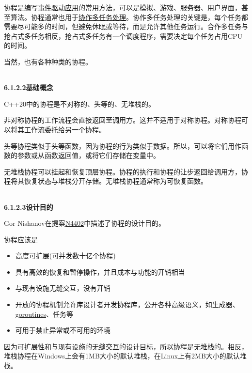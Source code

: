 协程是编写\href{https://en.wikipedia.org/wiki/Event-driven_programming}{事件驱动应用}的常用方法，可以是模拟、游戏、服务器、用户界面，甚至算法。协程通常也用于\href{https://en.wikipedia.org/wiki/Computer_multitasking}{协作多任务处理}。协作多任务处理的关键是，每个任务都需要尽可能多的时间，但避免休眠或等待，而是允许其他任务运行。合作多任务与抢占式多任务相反，抢占式多任务有一个调度程序，需要决定每个任务占用CPU的时间。

当然，也有各种种类的协程。

\hspace*{\fill} \\ %
\noindent
\textbf{6.1.2.2\hspace{0.2cm}基础概念}

C++20中的协程是不对称的、头等的、无堆栈的。

非对称协程的工作流程会直接返回至调用方。这并不适用于对称协程。对称协程可以将其工作流委托给另一个协程。

头等协程类似于头等函数，因为协程的行为类似于数据。所以，可以将它们用作函数的参数或从函数返回值，或将它们存储在变量中。

无堆栈协程可以挂起和恢复顶层协程。协程的执行和协程的让步返回给调用方，协程将其恢复状态与堆栈分开存储。无堆栈协程通常称为可恢复函数。

\hspace*{\fill} \\ %
\noindent
\textbf{6.1.2.3\hspace{0.2cm}设计目的}

Gor Nishanov在提案\href{https://isocpp.org/files/papers/N4402.pdf}{N4402}中描述了协程的设计目的。

协程应该是

\begin{itemize}
\item 
高度可扩展(可并发数十亿个协程)

\item 
具有高效的恢复和暂停操作，并且成本与功能的开销相当

\item 
与现有设施无缝交互，没有开销

\item 
开放的协程机制允许库设计者开发协程库，公开各种高级语义，如生成器、\href{https://tour.golang.org/concurrency/1}{goroutines}、任务等

\item 
可用于禁止异常或不可用的环境
\end{itemize}

因为可扩展性和与现有设施的无缝交互的设计目标，所以协程是无堆栈的。相反，堆栈协程在Windows上会有1MB大小的默认堆栈，在Linux上有2MB大小的默认堆栈。

